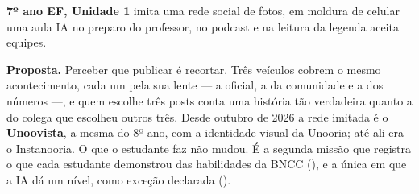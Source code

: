 
\textbf{7º ano EF, Unidade 1} \textperiodcentered{} imita uma rede social de
fotos, em moldura de celular \textperiodcentered{} uma aula
\textperiodcentered{} IA no preparo do professor, no podcast e na leitura da
legenda \textperiodcentered{} aceita equipes.

\textbf{Proposta.} Perceber que publicar é recortar. Três veículos cobrem o
mesmo acontecimento, cada um pela sua lente --- a oficial, a da comunidade e a
dos números ---, e quem escolhe três posts conta uma história tão verdadeira
quanto a do colega que escolheu outros três. Desde outubro de 2026 a rede
imitada é o \textbf{Unoovista}, a mesma do 8º ano, com a identidade visual da
Unooria; até ali era o Instanooria. O que o estudante faz não mudou. É a segunda missão que registra o
que cada estudante demonstrou das habilidades da BNCC (), e a única em
que a IA dá um nível, como exceção declarada ().

